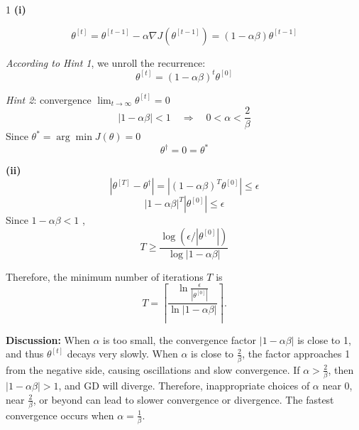 \begin{answer}
1
\textbf{(i)}  

\[
\theta^{[t]} = \theta^{[t-1]} - \alpha \nabla J(\theta^{[t-1]}) = (1 - \alpha \beta)\theta^{[t-1]}
\]

\textit{According to Hint 1}, we unroll the recurrence:
\[
\theta^{[t]} = (1 - \alpha \beta)^t \theta^{[0]}
\]

\textit{Hint 2}: convergence $\lim_{t \to \infty} \theta^{[t]} = 0$
\[
|1 - \alpha \beta| < 1 \quad \Rightarrow \quad 0 < \alpha < \frac{2}{\beta}
\]
Since $\theta^* = \arg\min J(\theta) = 0$
\[
\boxed{\theta^\dagger = 0 = \theta^*}
\]

\textbf{(ii)}  
\[
|\theta^{[T]} - \theta^\dagger| = |(1 - \alpha \beta)^T \theta^{[0]}| \leq \epsilon
\]
\[
|1 - \alpha \beta|^T |\theta^{[0]}| \leq \epsilon
\]
Since \(1 - \alpha \beta < 1\) ,
\[
\boxed{T \geq \frac{\log(\epsilon / |\theta^{[0]}|)}{\log|1 - \alpha \beta|}}
\]

Therefore, the minimum number of iterations $T$ is
\[
T = \left\lceil \frac{\ln \frac{\epsilon}{|\theta^{[0]}|}}{\ln |1 - \alpha \beta|} \right\rceil.
\]

\textbf{Discussion:}  
When $\alpha$ is too small, the convergence factor $|1 - \alpha \beta|$ is close to 1, and thus $\theta^{[t]}$ decays very slowly.  
When $\alpha$ is close to $\frac{2}{\beta}$, the factor approaches 1 from the negative side, causing oscillations and slow convergence.  
If $\alpha > \frac{2}{\beta}$, then $|1 - \alpha \beta| > 1$, and GD will diverge.  
Therefore, inappropriate choices of $\alpha$ near $0$, near $\frac{2}{\beta}$, or beyond can lead to slower convergence or divergence.  
The fastest convergence occurs when $\alpha = \frac{1}{\beta}$.


\end{answer}
